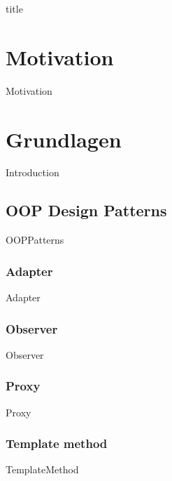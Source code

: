 \documentclass{article}
\begin{document}
{title}

\frontmatter

\tableofcontents

\listoffigures
\listoftables

\mainmatter

\section{Motivation}
    {Motivation}

\section{Grundlagen}
    {Introduction}

    \subsection{OOP Design Patterns}
        {OOPPatterns}
        
        \subsubsection{Adapter}
        \label{kap:gof:adapter}
            {Adapter}

        \subsubsection{Observer}
        \label{kap:gof:observer}
            {Observer}

        \subsubsection{Proxy}
        \label{kap:gof:proxy}
            {Proxy}

        \subsubsection{Template method}
        \label{kap:gof:templatemethod}
            {TemplateMethod}
\end{document}
